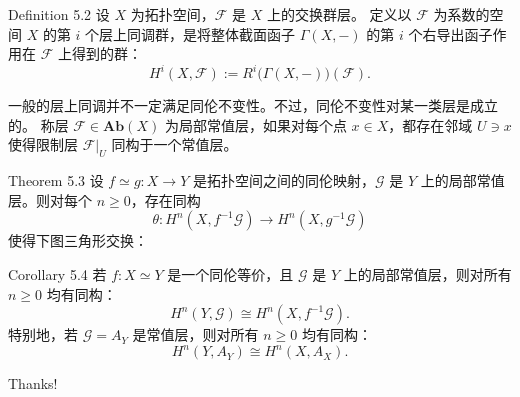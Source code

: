 \documentclass{beamer}
\begin{document}
\begin{frame}
\begin{block}{Definition 5.2}
设 $X$ 为拓扑空间，$\mathcal{F}$ 是 $X$ 上的交换群层。
定义以 $\mathcal{F}$ 为系数的空间 $X$ 的第 $i$ 个层上同调群，是将整体截面函子 $\Gamma(X,-)$ 的第 $i$ 个右导出函子作用在 $\mathcal{F}$ 上得到的群：
\[
H^i(X,\mathcal{F}):=R^i\big(\Gamma(X,-)\big)(\mathcal{F}).\tag{7.5}
\]
\end{block}

一般的层上同调并不一定满足同伦不变性。不过，同伦不变性对某一类层是成立的。
称层 $\mathcal{F}\in\mathbf{Ab}(X)$ 为局部常值层，如果对每个点 $x\in X$，都存在邻域 $U\ni x$ 使得限制层 $\mathcal{F}|_U$ 同构于一个常值层。
\end{frame}

\begin{frame}
\begin{block}{Theorem 5.3}
设 $f\simeq g:X\to Y$ 是拓扑空间之间的同伦映射，$\mathcal{G}$ 是 $Y$ 上的局部常值层。则对每个 $n\ge0$，存在同构
\[
\theta:H^n(X,f^{-1}\mathcal{G})\to H^n(X,g^{-1}\mathcal{G})
\]
使得下图三角形交换：
\end{block}
\begin{block}{Corollary 5.4}
若 $f:X\simeq Y$ 是一个同伦等价，且 $\mathcal{G}$ 是 $Y$ 上的局部常值层，则对所有 $n\ge0$ 均有同构：
\[
H^n(Y,\mathcal{G})\cong H^n(X,f^{-1}\mathcal{G}).
\]
特别地，若 $\mathcal{G}=A_Y$ 是常值层，则对所有 $n\ge0$ 均有同构：
\[
H^n(Y,A_Y)\cong H^n(X,A_X).
\]
\end{block}
\end{frame}

\begin{frame}
    \begin{center}
        {\Huge\calligra Thanks!}
    \end{center}
\end{frame}
\end{document}
